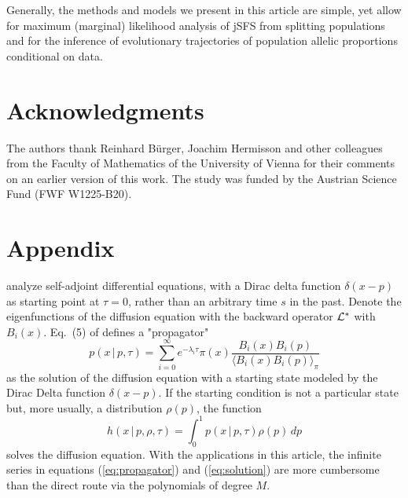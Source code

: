\documentclass[preprint]{elsarticle}
\newcommand\given{{\,|\,}}
\newcommand\eg{{\it e.g.,}}
\begin{document}
Generally, the methods and models we present in this article are simple, yet allow for maximum (marginal) likelihood analysis of jSFS from splitting populations and for the inference of evolutionary trajectories of population allelic proportions conditional on data. 

\section*{Acknowledgments}

The authors thank Reinhard B\"urger, Joachim Hermisson and other colleagues from the Faculty of Mathematics of the University of Vienna for their comments on an earlier version of this work. The study was funded by the Austrian Science Fund (FWF W1225-B20). %

\section{Appendix}\label{section:Greens_function}

\citet{Song12} analyze self-adjoint differential equations, with a Dirac delta function $\delta(x-p)$ as starting point at $\tau=0$, rather than an arbitrary time $s$ in the past. Denote the eigenfunctions of the diffusion equation with the backward operator $\cal{L}^*$ with $B_i(x)$. Eq.~(5) of \citet{Song12} defines a "propagator" \citep[][chap.~19]{Bayi06}
\begin{equation}\label{eq:propagator}
    p(x\given p,\tau)=\sum_{i=0}^\infty e^{-\lambda_i \tau}\pi(x) \frac{B_i(x)B_i(p)}{\langle B_i(x)B_i(p) \rangle_{\pi}}
\end{equation}
as the solution of the diffusion equation with a starting state modeled by the Dirac Delta function $\delta(x-p)$. If the starting condition is not a particular state but, more usually, a distribution $\rho(p)$, the function
\begin{equation}\label{eq:solution}
    h(x\given p,\rho,\tau)=\int_0^1 p(x\given p,\tau)\rho(p)\,dp
\end{equation}
solves the diffusion equation. With the applications in this article, the infinite series in equations (\ref{eq:propagator}) and (\ref{eq:solution}) are more cumbersome than the direct route via the polynomials of degree $M$. 

\end{document}
